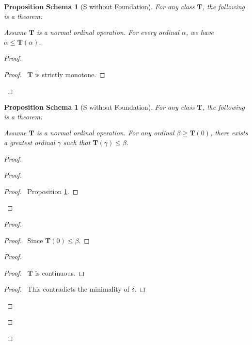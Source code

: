 \documentclass{book}
\let\qed\relax
\newtheorem{props}[ax]{Proposition Schema}
\theoremstyle{definition}
\begin{document}
\begin{props}[S without Foundation]
\label{prop:gammaltTgamma}
For any class $\mathbf{T}$, the following is a theorem:

Assume $\mathbf{T}$ is a normal ordinal operation. For every ordinal $\alpha$, we have $\alpha \leq \mathbf{T}(\alpha)$.
\end{props}

\begin{proof}
\pf
{}
\begin{proof}
	\pf\ $\mathbf{T}$ is strictly monotone.
\end{proof}
\qed
\end{proof}

\begin{props}[S without Foundation]
\label{prop:greatestordinal}
For any class $\mathbf{T}$, the following is a theorem:

Assume $\mathbf{T}$ is a normal ordinal operation. For any ordinal $\beta \geq \mathbf{T}(0)$, there exists a greatest ordinal $\gamma$ such that $\mathbf{T}(\gamma) \leq \beta$.
\end{props}

\begin{proof}
\pf
{}
\begin{proof}
	\begin{proof}
		\pf\ Proposition \ref{prop:gammaltTgamma}.
	\end{proof}
\end{proof}
\begin{proof}
	\begin{proof}
		\pf\ Since $\mathbf{T}(0) \leq \beta$.
	\end{proof}
	\begin{proof}
		\begin{proof}
			\pf\ $\mathbf{T}$ is continuous.
		\end{proof}
		\qedstep
		\begin{proof}
			\pf\ This contradicts the minimality of $\delta$.
		\end{proof}
	\end{proof}
\end{proof}
\qed
\end{proof}
\end{document}
